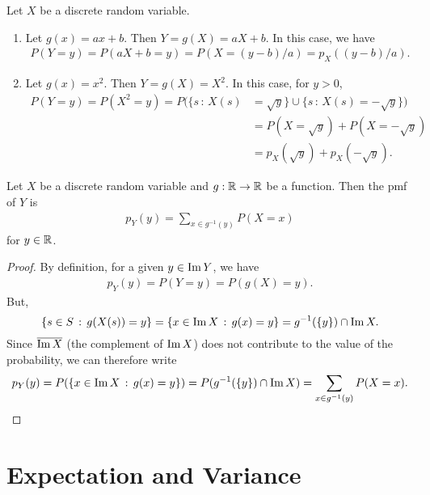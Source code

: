\begin{example}
Let $X$ be a discrete random variable.
    \begin{enumerate}[label=\alph*)]
        \item Let $g(x) = ax + b$. Then $Y = g (X) = aX + b$. In this case, we have
            \begin{align*}
            P (Y = y) = P (aX + b = y) = P (X = (y-b)/a) = p_X( (y-b)/a) .
            \end{align*} 
        \item Let $g(x) = x^2$. Then $Y = g(X) = X^2$. In this case, for $y > 0$, 
            \begin{align*}
            P (Y = y) = P (X^2 = y) = P ( \{ s \, : \, X(s) &= \sqrt{y} \} \cup \{ s \, : \, X (s) = -\sqrt{y} \} ) \\
            &= P (X = \sqrt{y}) + P (X = -\sqrt{y}) \\
            &= p_X (\sqrt{y}) + p_X (-\sqrt{y}) .
            \end{align*}
    \end{enumerate}
\end{example}

\begin{theorem}
Let $X$ be a discrete random variable and $g : \mathbb{R} \rightarrow \mathbb{R}$ be a function. Then the pmf of $Y$ is
    \begin{align*}
    p_Y (y) = \sum_{x \in g^{-1} (y)} P (X = x) 
    \end{align*} 
for $y \in \mathbb{R}$.
\end{theorem}
\begin{proof}
By definition, for a given $y \in \operatorname{Im} Y$, we have
    \begin{align*}
    p_Y (y) = P(Y = y) = P (g (X) = y) .
    \end{align*}
But, 
    $$
    \{ s \in S \, : \,  g (X (s)) = y \} = \{ x \in \operatorname{Im} X \, : \, g (x) = y \} = g^{-1} (\{ y \}) \cap \operatorname{Im} X.
    $$
Since $\overline{\operatorname{Im} X}$ (the complement of $\operatorname{Im} X$) does not contribute to the value of the probability, we can therefore write
    \begin{equation*}
    p_Y (y) = P ( \{ x \in \operatorname{Im} X \, : \, g (x) = y \}) = P (g^{-1} (\{ y \}) \cap \operatorname{Im} X) = \sum_{x \in g^{-1} (y)} P (X = x) . \qedhere
    \end{equation*}
\end{proof}

\section{Expectation and Variance}

